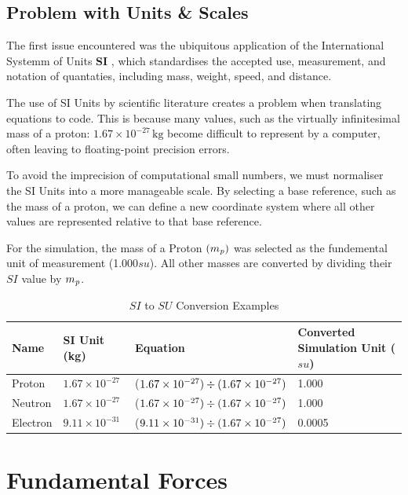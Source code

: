 \subsection{Problem with Units \& Scales}

The first issue encountered was the ubiquitous application of the International Systemm of Units \textbf{SI} \autocite{nist_si_units}, which standardises the accepted use, measurement, and notation
of quantaties, including mass, weight, speed, and distance.

The use of SI Units by scientific literature creates a problem when translating equations to code. This is because many values, such as the virtually infinitesimal mass of a proton: 
$1.67 \times 10^{-27}\,\mathrm{kg}$ become difficult to represent by a computer, often leaving to floating-point precision errors.

To avoid the imprecision of computational small numbers, we must normaliser the SI Units into a more manageable scale. By selecting a base reference, such as the mass of a proton, we can define
a new coordinate system where all other values are represented relative to that base reference.

For the simulation, the mass of a Proton $(m_{\textit{p}})$ was selected as the fundemental unit of measurement (1.000$su$). All other masses are converted by dividing their $SI$ value by $m_{\textit{p}}$.

\begin{table}[h]
\centering
\caption{$SI$ to $SU$ Conversion Examples }
\label{tab:si-to-su-conversion}
\begin{tabular}{llll}
\toprule
Name     & SI Unit (kg) & Equation & Converted Simulation Unit ($su$) \\ \midrule
Proton   & $1.67 \times 10^{-27}$ & ($1.67 \times 10^{-27}) \divisionsymbol (1.67 \times 10^{-27})$ & 1.000 \\
Neutron  & $1.67 \times 10^{-27}$ & ($1.67 \times 10^{-27}) \divisionsymbol (1.67 \times 10^{-27})$ & 1.000 \\
Electron & $9.11 \times 10^{-31}$ & ($9.11 \times 10^{-31}) \divisionsymbol (1.67 \times 10^{-27})$ & 0.0005 \\ \bottomrule
\end{tabular}
\end{table}

\break{}

\section{Fundamental Forces}

